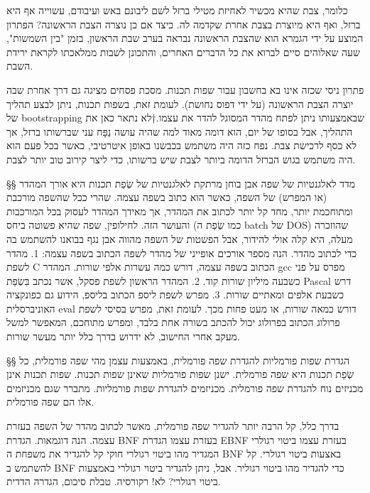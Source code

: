     כלומר, צבת שהיא מכשיר לאחיזת מטילי
    ברזל לשם ליבונם באש ועיבודם, עשוייה אף היא ברזל, ואף היא מיוצרת בצבת אחרת שקדמה
    לה. כיצד אם כן נוצרה הצבת הראשונה? הפתרון המוצע על ידי הגמרא הוא שהצבת הראשונה     נבראה בערב שבת הראשון, בזמן "בין השמשות", שעה שאלוהים סיים לברוא את כל הדברים
    האחרים, והתכונן לשבות ממלאכתו לקראת ירידת השבת. 
    
    פתרון ניסי שכזה אינו בא בחשבון
    עבור שפות תכנות. מסכת פסחים מציגה גם דרך אחרת שבה יוצרה הצבת הראשונה (על ידי
    דפוס נחושת). לעומת זאת, בשפות תכנות, ניתן לבצע תהליך של bootstrapping שבאמצעותו
    ניתן לפתח מהדר המסוגל להדר את עצמו.†{לא נתאר כאן את התהליך, אבל בסופו של יום, הוא דומה מאוד למה שהיה עושה נַפָּח עני שברשותו ברזל, אך לא כסף לרכישת צבת. נפח כזה היה משתמש בכבשנו באופן איטרטיבי, כאשר בכל פעם הוא היה משתמש בגוש הברזל הדומה ביותר לצבת שיש ברשותו, כדי ליצר קירוב טוב יותר לצבת.} 
    
§§ מדד לאלגנטיות של שפה
אבן בוחן מרתקת לאלגנטיות של שְׂפַת תכנות היא אורך המהדר (או המפרש) של השפה, כאשר הוא כתוב בשפה עצמה. שהרי ככל שהשפה מורכבת ומתוחכמת יותר, מחד קל יותר לכתוב את המהדר, אך מאידך המהדר לעסוק בכל המורכבות והעושר הזה.
    לחילופין, שפה שהיא פשוטה ביחס (כמו שְׂפַת ה batch של DOS) שהוזכרה מעלה, היא קלה אולי להידור, אבל הפשטות של השפה מהווה אבן נגף בבואנו להשתמש בה כדי לכתוב מהדר.
    הנה מספר אורכים אופייני של מהדר לשפה הכתוב בשפה עצמה:
    1. מהדר לשפת C הכתוב בשפה עצמה, דורש כמה עשרות אלפי שורות. המהדר gcc מפרס על פני כשבעה מיליון שורות קוד.
    2. המהדר הראשון לשפת פסקל, אשר נכתב בִּשְׂפַת Pascal דרש כשבעת אלפים ומאתיים שורות.
    3. מפרש לשפת ליספ הכתוב בליספ, הידוע גם כפונקציה האוניברסלית eval דורש כמאה שורות, או מעט פחות מכך.
    לעומת זאת, מפרש בסיסי לשפת פרולוג הכתוב בפרולוג יכול להכתב בשורה אחת בלבד, ומפרש מתוחכם, המאפשר למשל מעקב אחרי החישוב, לא ידרוש בדרך כלל יותר מעשר שורות.
      
§§ הגדרת שפות פורמליות להגדרת שפה פורמלית, באמצעות עצמן
    מהי שפה פורמלית, כל שְׂפַת תכנות היא שפה פורמלית. ישנן שפות פורמליות שאינן שפות תכנות.
    שפות תכנות אינן מכניזים נוח להגדרת שפה פורמלית.
    מכניזמים להגדרת שפות פורמליות. מתברר שגם מכניזמים אלו הם שפה פורמלית.
    
    בדרך כלל, קל הרבה יותר להגדיר שפה פורמלית, מאשר לכתוב מהדר של השפה בעזרת עצמה.
    הנה דוגמאות.
    הגדרת BNF בעזרת עצמו
    הגדרת EBNF בעזרת עצמו
    ביטוי רגולרי המגדיר מהו ביטוי רגולרי חוקי
    קל להגדיר את משפחת ה BNF באצעות ביטוי רגולרי.
    קל להשתמש ב BNF כדי להגדיר מהו ביטוי רגוליר.
    אבל, ניתן להגדיר ביטוי רגולרי באמצעות ביטוי רגולרי? לא! רקורסיה.
    טבלת סיכום, הגדרה הדדית.
    
